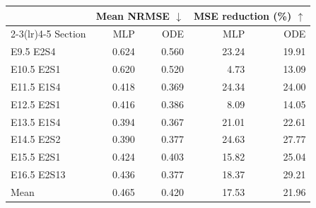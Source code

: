 \begin{tabular}{lrrrr}
\toprule
 & \multicolumn{2}{c}{Mean NRMSE $\downarrow$} & \multicolumn{2}{c}{MSE reduction (\%) $\uparrow$} \\
\cmidrule(lr){2-3}\cmidrule(lr){4-5}
Section & MLP & ODE & MLP & ODE \\
\midrule
E9.5 E2S4 & 0.624 & 0.560 & 23.24 & 19.91 \\
E10.5 E2S1 & 0.620 & 0.520 & 4.73 & 13.09 \\
E11.5 E1S4 & 0.418 & 0.369 & 24.34 & 24.00 \\
E12.5 E2S1 & 0.416 & 0.386 & 8.09 & 14.05 \\
E13.5 E1S4 & 0.394 & 0.367 & 21.01 & 22.61 \\
E14.5 E2S2 & 0.390 & 0.377 & 24.63 & 27.77 \\
E15.5 E2S1 & 0.424 & 0.403 & 15.82 & 25.04 \\
E16.5 E2S13 & 0.436 & 0.377 & 18.37 & 29.21 \\
Mean & 0.465 & 0.420 & 17.53 & 21.96 \\
\bottomrule
\end{tabular}
